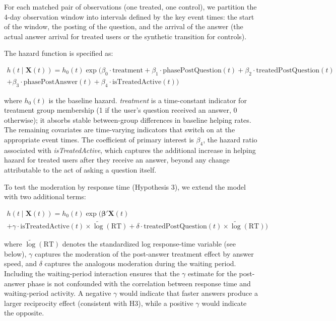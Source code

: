 For each matched pair of observations (one treated, one control), we partition the 4-day observation window into intervals defined by the key event times: the start of the window, the posting of the question, and the arrival of the answer (the actual answer arrival for treated users or the synthetic transition for controls).

The hazard function is specified as:

\begin{multline}
\label{eq:cox}
h(t \mid \mathbf{X}(t)) = h_0(t) \exp\big(\beta_0 \cdot \text{treatment} + \beta_1 \cdot \text{phasePostQuestion}(t) + \beta_2 \cdot \text{treatedPostQuestion}(t) \\
+ \beta_3 \cdot \text{phasePostAnswer}(t) + \beta_4 \cdot \text{isTreatedActive}(t) \big)
\end{multline}

\noindent where $h_0(t)$ is the baseline hazard. \textit{treatment} is a time-constant indicator for treatment group membership (1 if the user's question received an answer, 0 otherwise); it absorbs stable between-group differences in baseline helping rates. The remaining covariates are time-varying indicators that switch on at the appropriate event times. The coefficient of primary interest is $\beta_4$, the hazard ratio associated with \textit{isTreatedActive}, which captures the additional increase in helping hazard for treated users after they receive an answer, beyond any change attributable to the act of asking a question itself.

To test the moderation by response time (Hypothesis 3), we extend the model with two additional terms:

\begin{multline}
\label{eq:cox_speed}
h(t \mid \mathbf{X}(t)) = h_0(t) \exp\Big(\boldsymbol{\beta}' \mathbf{X}(t) \\
+ \gamma \cdot \text{isTreatedActive}(t) \times \widetilde{\log}(\text{RT}) + \delta \cdot \text{treatedPostQuestion}(t) \times \widetilde{\log}(\text{RT}) \Big)
\end{multline}

\noindent where $\widetilde{\log}(\text{RT})$ denotes the standardized log response-time variable (see below), $\gamma$ captures the moderation of the post-answer treatment effect by answer speed, and $\delta$ captures the analogous moderation during the waiting period. Including the waiting-period interaction ensures that the $\gamma$ estimate for the post-answer phase is not confounded with the correlation between response time and waiting-period activity. A negative $\gamma$ would indicate that faster answers produce a larger reciprocity effect (consistent with H3), while a positive $\gamma$ would indicate the opposite.

